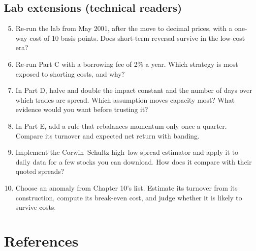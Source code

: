 \subsection*{Lab extensions (technical readers)}

\begin{enumerate}
  \setcounter{enumi}{4}
  \item Re-run the lab from May 2001, after the move to decimal prices, with a one-way cost of 10 basis points. Does short-term reversal survive in the low-cost era?
  \item Re-run Part C with a borrowing fee of 2\% a year. Which strategy is most exposed to shorting costs, and why?
  \item In Part D, halve and double the impact constant and the number of days over which trades are spread. Which assumption moves capacity most? What evidence would you want before trusting it?
  \item In Part E, add a rule that rebalances momentum only once a quarter. Compare its turnover and expected net return with banding.
  \item Implement the Corwin--Schultz high--low spread estimator and apply it to daily data for a few stocks you can download. How does it compare with their quoted spreads?
  \item Choose an anomaly from Chapter 10's list. Estimate its turnover from its construction, compute its break-even cost, and judge whether it is likely to survive costs.
\end{enumerate}

\section*{References}

